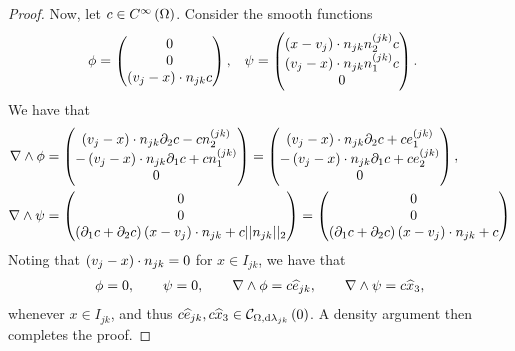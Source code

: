 \begin{proof}
	Now, let $c\in C^{\infty}\left( \Omega \right)$.
	Consider the smooth functions
	\begin{align*}
		\phi = \begin{pmatrix} 0 \\ 0 \\ \left( v_j - x \right)\cdot n_{jk} c \end{pmatrix}, &\quad
		\psi = \begin{pmatrix} \left( x - v_j \right)\cdot n_{jk} n_2^{(jk)}c \\ \left( v_j - x \right)\cdot n_{jk} n_1^{(jk)}c \\ 0 \end{pmatrix}.
	\end{align*}
	We have that
	\begin{align*}
		\nabla\wedge\phi &= \begin{pmatrix} \left( v_j-x \right)\cdot n_{jk} \partial_2 c - c n_2^{(jk)} \\ -\left( v_j-x \right)\cdot n_{jk} \partial_1 c + c n_1^{(jk)} \\ 0 \end{pmatrix}
		= \begin{pmatrix} \left( v_j-x \right)\cdot n_{jk} \partial_2 c + c e_1^{(jk)} \\ -\left( v_j-x \right)\cdot n_{jk} \partial_1 c + c e_2^{(jk)} \\ 0 \end{pmatrix}, \\
		\nabla\wedge\psi &= \begin{pmatrix} 0 \\ 0 \\ \left( \partial_1 c + \partial_2 c \right)\left( x-v_j \right)\cdot n_{jk} + c\lvert\lvert n_{jk} \rvert\rvert_2 \end{pmatrix}
		= \begin{pmatrix} 0 \\ 0 \\ \left( \partial_1 c + \partial_2 c \right)\left( x-v_j \right)\cdot n_{jk} + c \end{pmatrix}
	\end{align*}
	Noting that $\left( v_j - x \right)\cdot n_{jk}=0$ for $x\in I_{jk}$, we have that
	\begin{align*}
		\phi = 0, \qquad \psi = 0, \qquad \nabla\wedge\phi = c\widehat{e}_{jk}, \qquad \nabla\wedge\psi = c\widehat{x}_3,
	\end{align*}
	whenever $x\in I_{jk}$, and thus $c\widehat{e}_{jk}, c\widehat{x}_3\in\mathcal{C}_{ \Omega, \mathrm{d}\lambda_{jk}}\left( 0 \right)$.
	A density argument then completes the proof.
\end{proof}

